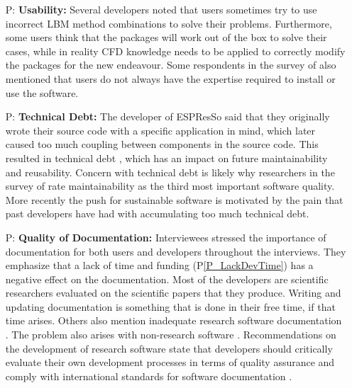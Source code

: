 \documentclass[final, 3p, times, authoryear]{elsarticle}
\newcounter{pnum} %
\newcommand{\ppref}[1]{P\ref{#1}}
\begin{document}
\begin{enumerate}
	\item[P\refstepcounter{pnum}\thepnum \label{P_Usability}:]
	\textbf{Usability:} Several developers noted that users sometimes try to use
	incorrect LBM method combinations to solve their problems. Furthermore, some
	users think that the packages will work out of the box to solve their cases,
	while in reality CFD knowledge needs to be applied to correctly modify the
	packages for the new endeavour.  Some respondents in the survey of
	\citet{WieseEtAl2019} also mentioned that users do not always have the
	expertise required to install or use the software.
	
	\item[P\refstepcounter{pnum}\thepnum \label{P_TechDebt}:] \textbf{Technical
	Debt:} The developer of ESPResSo said that they originally wrote their source
	code with a specific application in mind, which later caused too much
	coupling between components in the source code. This resulted in technical
	debt \citep{KruchtenEtAl2012}, which has an impact on future maintainability
	and reusability. Concern with technical debt is likely why researchers in
	the survey of \citet{Nguyen-HoanEtAl2010} rate maintainability as the third
	most important software quality. More recently the push for sustainable
	software \citep{deSouzaEtAl2019} is motivated by the pain that past
	developers have had with accumulating too much technical debt.

	\item[P\refstepcounter{pnum}\thepnum \label{P_Documentation}:]
	\textbf{Quality of Documentation:}  Interviewees stressed the importance of
	documentation for both users and developers throughout the interviews. They
	emphasize that a lack of time and funding (\ppref{P_LackDevTime}) has a
	negative effect on the documentation. Most of the developers are scientific
	researchers evaluated on the scientific papers that they produce. Writing
	and updating documentation is something that is done in their free time, if
	that time arises. Others also mention inadequate research software
	documentation \citep{PintoEtAl2018, WieseEtAl2019}.  The problem also arises
	with non-research software \citep{LethbridgeEtAl2003}. Recommendations on
	the development of research software state that developers should critically
	evaluate their own development processes in terms of quality assurance and
	comply with international standards for software documentation
	\citep{KaterbowAndFeulner2018}.

\end{enumerate}
\end{document}
